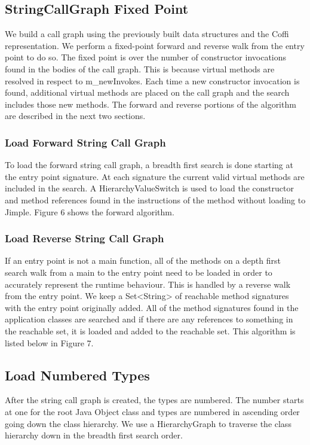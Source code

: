 \documentclass[preprint]{sigplanconf}
\begin{document}
\subsection{StringCallGraph Fixed Point}
We build a call graph using the previously built data structures and the Coffi representation. We perform a fixed-point forward and reverse walk from the entry point to do so. The fixed point is over the number of constructor invocations found in the bodies of the call graph. This is because virtual methods are resolved in respect to m\_newInvokes. Each time a new constructor invocation is found, additional virtual methods are placed on the call graph and the search includes those new methods. The forward and reverse portions of the algorithm are described in the next two sections.

\subsubsection{Load Forward String Call Graph}
To load the forward string call graph, a breadth first search is done starting at the entry point signature. At each signature the current valid virtual methods are included in the search. A HierarchyValueSwitch is used to load the constructor and method references found in the instructions of the method without loading to Jimple. Figure 6 shows the forward algorithm. 

\subsubsection{Load Reverse String Call Graph}
If an entry point is not a main function, all of the methods on a depth first search walk from a main to the entry point need to be loaded in order to accurately represent the runtime behaviour. This is handled by a reverse walk from the entry point. We keep a Set<String> of reachable method signatures with the entry point originally added. All of the method signatures found in the application classes are searched and if there are any references to something in the reachable set, it is loaded and added to the reachable set. This algorithm is listed below in Figure 7.

\subsection{Load Numbered Types}
After the string call graph is created, the types are numbered. The number starts at one for the root Java Object class and types are numbered in ascending order going down the class hierarchy. We use a HierarchyGraph to traverse the class hierarchy down in the breadth first search order.
\end{document}
